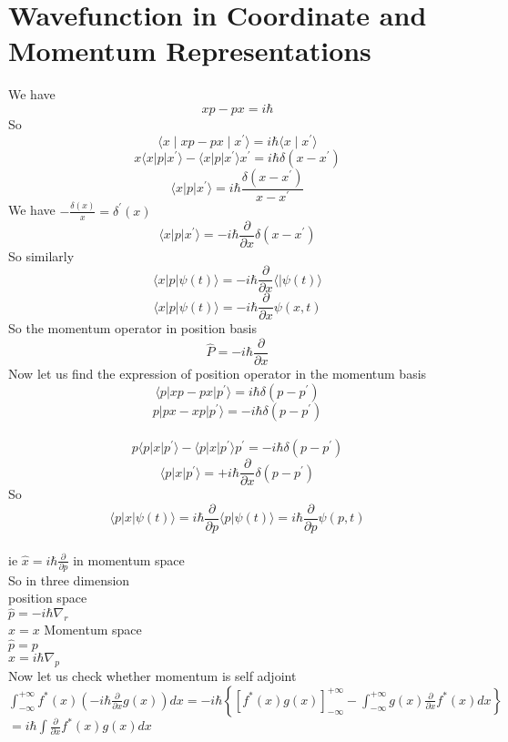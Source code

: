 \section{Wavefunction in Coordinate and Momentum Representations}
We have $$xp-px=i\hbar$$
So $$\langle x\mid xp-px\mid x^{\prime}\rangle=i\hbar\langle x\mid x^{\prime}\rangle$$
$$x\langle x |p|x^{\prime}\rangle -\langle x |p|x^{\prime}\rangle x^{\prime}=i\hbar \delta(x-x^{\prime})$$
$$\langle x|p|x^{\prime}\rangle =i\hbar \frac{\delta(x-x^{\prime})}{x-x^{\prime}}$$
We have $-\frac{\delta(x)}{x}=\delta^{\prime}(x)$\\
$$\langle x|p|x^{\prime}\rangle=-i\hbar \frac{\partial}{\partial x}\delta(x-x^{\prime})$$
So similarly $$\langle x|p|\psi(t)\rangle=-i\hbar\frac{\partial}{\partial x} \langle|\psi(t)\rangle$$
$$\langle x|p|\psi(t)\rangle=-i\hbar \frac{\partial }{\partial x}\psi(x,t)$$
So the momentum operator in position basis \\
$$\hat{P}=-i\hbar \frac{\partial}{\partial x}$$
Now let us find the expression of position operator in the momentum basis \\
$$\langle p|xp-px|p^{\prime}\rangle =i\hbar \delta (p-p^{\prime})$$
$$p|px-xp|p^{\prime}\rangle =-i\hbar \delta(p-p^{\prime})$$\\
$$p\langle p|x|p^{\prime}\rangle -\langle p|x|p^{\prime}\rangle p^{\prime}=-i\hbar\delta(p-p^{\prime})$$
$$\langle p|x|p^{\prime}\rangle=+i\hbar\frac{\partial}{\partial x}\delta(p-p^{\prime})$$
So $$\langle p|x|\psi(t)\rangle =i\hbar\frac{\partial}{\partial p} \langle p|\psi(t)\rangle=i\hbar\frac{\partial}{\partial p}\psi (p,t)$$\\
ie $\hat{x}=i\hbar\frac{\partial}{\partial p}$ in momentum space\\
So in three dimension \\
position space\\
$\hat{p}=-i\hbar \nabla_{r}$\\
$\hat{x}=x$
Momentum space\\
$\hat{p}=p$\\
$\hat{x}=i\hbar \nabla_{p}$\\
Now let us check whether momentum is self adjoint\\
$\int_{-\infty}^{+\infty} f^*(x)\left( -i\hbar \frac{\partial}{\partial x}g(x)\right)dx=-i\hbar\left\lbrace  \left[ f^{*}(x)g(x) \right]_{-\infty}^{+\infty}-\int_{-\infty}^{+\infty} g(x)\frac{\partial}{\partial x}f^*(x)dx\right\rbrace $\\
$=i\hbar \int \frac{\partial}{\partial x} f^*(x) g(x)dx$
